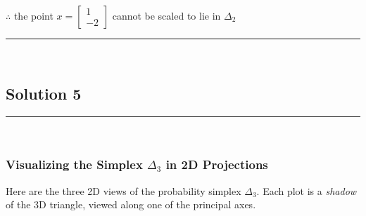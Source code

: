 \documentclass{article}
\begin{document}
\subsubsection*{\normalfont}{$\therefore$ the point $x = \begin{bmatrix} 1 \\ -2 \end{bmatrix}$ cannot be scaled to lie in $\Delta_{2}$}

\noindent\rule{\textwidth}{0.4pt}\\

\newpage

\subsection*{Solution 5}
\noindent\rule{\textwidth}{0.4pt}\\

\subsubsection*{Visualizing the Simplex $\Delta_3$ in 2D Projections}
\parbox{\textwidth}{
Here are the three 2D views of the probability simplex $\Delta_3$. Each plot is a \textit{shadow} of the 3D triangle, viewed along one of the principal axes.
}
\end{document}
